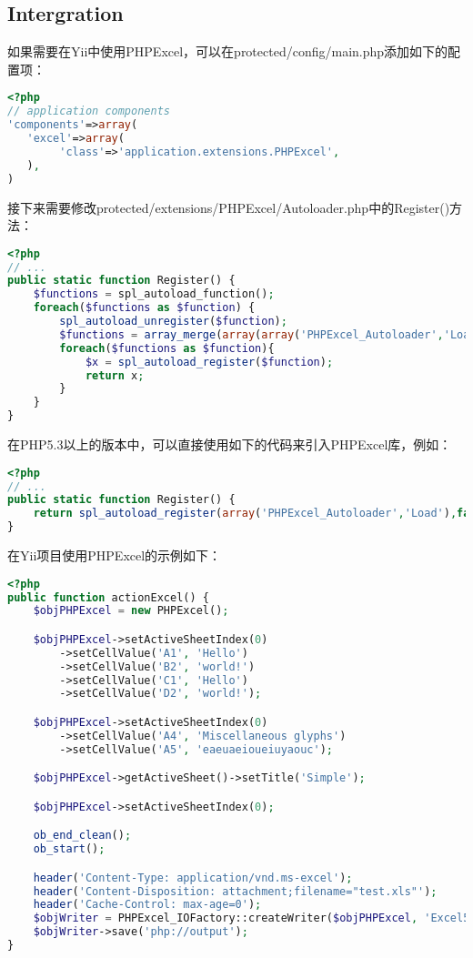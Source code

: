 \subsection{Intergration}

如果需要在Yii中使用PHPExcel，可以在protected/config/main.php添加如下的配置项：


\begin{lstlisting}[language=PHP]
<?php
// application components
'components'=>array(
   'excel'=>array(
        'class'=>'application.extensions.PHPExcel',
   ),
)
\end{lstlisting}

接下来需要修改protected/extensions/PHPExcel/Autoloader.php中的Register()方法：

\begin{lstlisting}[language=PHP]
<?php
// ...
public static function Register() {
    $functions = spl_autoload_function();
    foreach($functions as $function) {
        spl_autoload_unregister($function);
        $functions = array_merge(array(array('PHPExcel_Autoloader','Load')),$functions);
        foreach($functions as $function){
            $x = spl_autoload_register($function);
            return x;
        }
    }
}
\end{lstlisting}


在PHP5.3以上的版本中，可以直接使用如下的代码来引入PHPExcel库，例如：

\begin{lstlisting}[language=PHP]
<?php
// ...
public static function Register() {
    return spl_autoload_register(array('PHPExcel_Autoloader','Load'),false,true);
}
\end{lstlisting}

在Yii项目使用PHPExcel的示例如下：


\begin{lstlisting}[language=PHP]
<?php
public function actionExcel() {
    $objPHPExcel = new PHPExcel();

    $objPHPExcel->setActiveSheetIndex(0)
        ->setCellValue('A1', 'Hello')
        ->setCellValue('B2', 'world!')
        ->setCellValue('C1', 'Hello')
        ->setCellValue('D2', 'world!');

    $objPHPExcel->setActiveSheetIndex(0)
        ->setCellValue('A4', 'Miscellaneous glyphs')
        ->setCellValue('A5', 'eaeuaeioueiuyaouc');

    $objPHPExcel->getActiveSheet()->setTitle('Simple');

    $objPHPExcel->setActiveSheetIndex(0);

    ob_end_clean();
    ob_start();

    header('Content-Type: application/vnd.ms-excel');
    header('Content-Disposition: attachment;filename="test.xls"');
    header('Cache-Control: max-age=0');
    $objWriter = PHPExcel_IOFactory::createWriter($objPHPExcel, 'Excel5');
    $objWriter->save('php://output');
}
\end{lstlisting}


